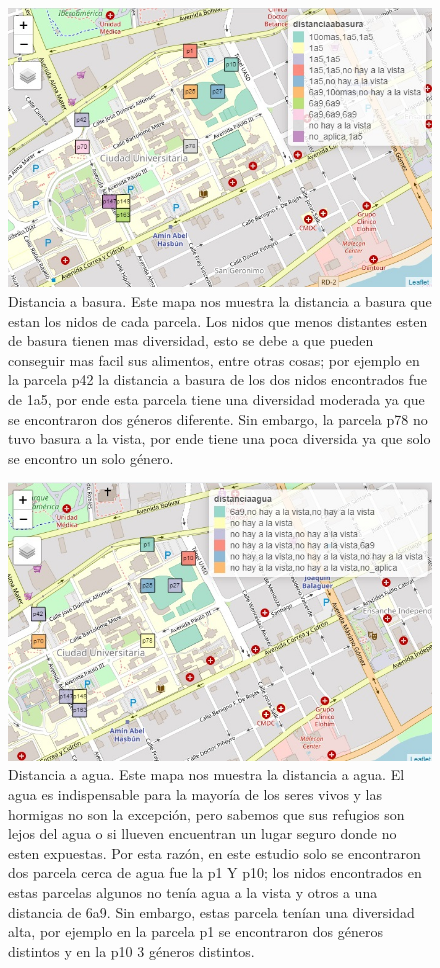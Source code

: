 \documentclass[11pt,]{article}
\begin{document}
\begin{figure}
\centering
\includegraphics{distancia a basura.jpg}
\caption{Distancia a basura. Este mapa nos muestra la distancia a basura
que estan los nidos de cada parcela. Los nidos que menos distantes esten
de basura tienen mas diversidad, esto se debe a que pueden conseguir mas
facil sus alimentos, entre otras cosas; por ejemplo en la parcela p42 la
distancia a basura de los dos nidos encontrados fue de 1a5, por ende
esta parcela tiene una diversidad moderada ya que se encontraron dos
géneros diferente. Sin embargo, la parcela p78 no tuvo basura a la
vista, por ende tiene una poca diversida ya que solo se encontro un solo
género.}
\end{figure}

\begin{figure}
\centering
\includegraphics{distanciaagua.jpg}
\caption{Distancia a agua. Este mapa nos muestra la distancia a agua. El
agua es indispensable para la mayoría de los seres vivos y las hormigas
no son la excepción, pero sabemos que sus refugios son lejos del agua o
si llueven encuentran un lugar seguro donde no esten expuestas. Por esta
razón, en este estudio solo se encontraron dos parcela cerca de agua fue
la p1 Y p10; los nidos encontrados en estas parcelas algunos no tenía
agua a la vista y otros a una distancia de 6a9. Sin embargo, estas
parcela tenían una diversidad alta, por ejemplo en la parcela p1 se
encontraron dos géneros distintos y en la p10 3 géneros distintos.}
\end{figure}
\end{document}
